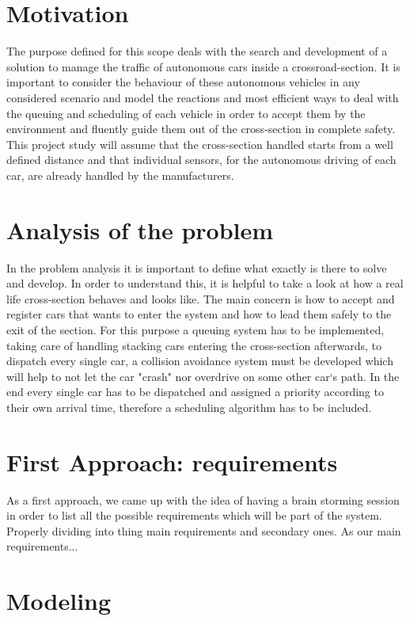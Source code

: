 \documentclass[conference]{IEEEtran}
\begin{document}
\section{Motivation}
The purpose defined for this scope deals with the search and development of a solution to manage the traffic of autonomous cars inside a crossroad-section. It is important to consider the behaviour of these autonomous vehicles in any considered scenario and model the reactions and most efficient ways to deal with the queuing and scheduling of each vehicle in order to accept them by the environment and fluently guide them out of the cross-section in complete safety. This project study will assume that the cross-section handled starts from a well defined distance and that individual sensors, for the autonomous driving of each car, are already handled by the manufacturers. 

\section{Analysis of the problem}
In the problem analysis it is important to define what exactly is there to solve and develop. In order to understand this, it is helpful to take a look at how a real life cross-section behaves and looks like. The main concern is how to accept and register cars that wants to enter the system and how to lead them safely to the exit of the section. For this purpose a queuing system has to be implemented, taking care of handling stacking cars entering the cross-section afterwards, to dispatch every single car, a collision avoidance system must be developed which will help to not let the car "crash" nor overdrive on some other car`s path. In the end every single car has to be dispatched and assigned a priority according to their own arrival time, therefore a scheduling algorithm has to be included.

\section{First Approach: requirements}
As a first approach, we came up with the idea of having a brain storming session in order to list all the possible requirements which will be part of the system. Properly dividing into thing main requirements and secondary ones. As our main requirements...



\section{Modeling}
\end{document}
